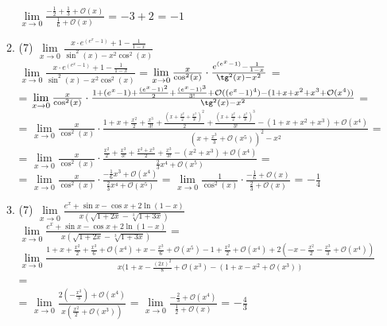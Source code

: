 \documentclass[a4paper]{article}
\begin{document}
\begin{enumerate}
\begin{enumerate}
         $\lim\limits_{x\to 0}\frac{-\frac{1}{2} + \frac{1}{3} + \mathcal O(x)}{\frac{1}{6} + \mathcal O(x)}$ = 
         $-3 + 2$ = $-1$
        \item (7) $\lim\limits_{x\to 0}\frac{x\cdot e^{(e^x-1)}+1-\frac{1}{1-x}}{\sin^2(x)-x^2\cos^2(x)}$\\
        $\lim\limits_{x\to 0}\frac{x\cdot e^{(e^x-1)}+1-\frac{1}{1-x}}{\sin^2(x)-x^2\cos^2(x)}$ = $\lim\limits_{x\to 0}\frac{x}{\cos^2(x)}\cdot\frac{e^{(e^x-1)}-\frac{1}{1-x}}{\tg^2(x)-x^2}$ =\\= 
        $\lim\limits_{x\to 0}\frac{x}{\cos^2(x)}\cdot\frac{1 + (e^x-1) + \frac{(e^x-1)^2}{2} + \frac{(e^x-1)^3}{3!} + \mathcal O((e^x-1)^4) - (1 + x + x^2 + x^3 + \mathcal O(x^4))}{\tg^2(x)-x^2}$ =\\= $\lim\limits_{x\to 0}\frac{x}{\cos^2(x)}\cdot\frac{1 + x + \frac{x^2}{2} + \frac{x^3}{3!} + \frac{(x + \frac{x^2}{2} + \frac{x^3}{3!})^2}{2} + \frac{(x + \frac{x^2}{2} + \frac{x^3}{3!})^3}{3!} -(1 + x + x^2 + x^3) + \mathcal O(x^4)}{(x + \frac{x^3}{3} + \mathcal O(x^5))^2-x^2}$ =\\= $\lim\limits_{x\to 0}\frac{x}{\cos^2(x)}\cdot\frac{\frac{x^2}{2} + \frac{x^3}{3!} + \frac{x^2 + x^3}{2} + \frac{x^3}{3!} -(x^2 + x^3) + \mathcal O(x^4)}{\frac{2}{3}x^4 + \mathcal O(x^5)}$ =\\=
        $\lim\limits_{x\to 0}\frac{x}{\cos^2(x)}\cdot\frac{-\frac{1}{6}x^3 + \mathcal O(x^4)}{\frac{2}{3}x^4 + \mathcal O(x^5)}$ = $\lim\limits_{x\to 0}\frac{1}{\cos^2(x)}\cdot\frac{-\frac{1}{6} + \mathcal O(x)}{\frac{2}{3} + \mathcal O(x)}$ = $-\frac{1}{4}$
        \item (7) $\lim\limits_{x\to 0} \frac{e^x+\sin x - \cos x + 2\ln(1-x)}{x(\sqrt{1+2x}-\sqrt[3]{1+3x})}$\\
        $\lim\limits_{x\to 0} \frac{e^x+\sin x - \cos x + 2\ln(1-x)}{x(\sqrt{1+2x}-\sqrt[3]{1+3x})}$ = $\lim\limits_{x\to 0} \frac{1 + x + \frac{x^2}{2} + \frac{x^3}{6} + \mathcal O(x^4) + x - \frac{x^3}{6} + \mathcal O(x^5) - 1 + \frac{x^2}{2} + \mathcal O(x^4) + 2(-x - \frac{x^2}{2} - \frac{x^3}{3} + \mathcal O(x^4))}{x(1 + x - \frac{(2x)^2}{8} + \mathcal O(x^3) - (1 + x - x^2 + \mathcal O(x^3))}$ =\\=
         $\lim\limits_{x\to 0} \frac{2(-\frac{x^3}{3}) + \mathcal O(x^4) }{x(\frac{x^2}{2} + \mathcal O(x^3))}$ = 
         $\lim\limits_{x\to 0} \frac{-\frac{2}{3} + \mathcal O(x^4) }{\frac{1}{2} + \mathcal O(x)}$ = $-\frac{4}{3}$
    \end{enumerate}
    

\end{enumerate}
\end{document}
